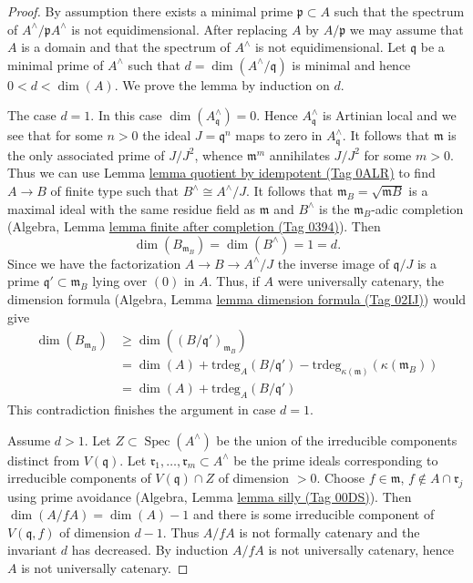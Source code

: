 \documentclass{amsart}
\theoremstyle{plain}
\theoremstyle{definition}
\theoremstyle{remark}
\numberwithin{equation}{subsection}
\def\Spec{\mathop{\mathrm{Spec}}}
\begin{document}
\begin{proof}
By assumption there exists a minimal prime $\mathfrak p \subset A$ such that
the spectrum of $A^\wedge /\mathfrak p A^\wedge$ is not equidimensional.
After replacing $A$ by $A/\mathfrak p$ we may assume that $A$
is a domain and that the spectrum of $A^\wedge$ is not equidimensional.
Let $\mathfrak q$ be a minimal prime of
$A^\wedge$ such that $d = \dim(A^\wedge/\mathfrak q)$
is minimal and hence $0 < d < \dim(A)$. We prove the lemma by induction
on $d$.

\medskip\noindent
The case $d = 1$. In this case $\dim(A^\wedge_\mathfrak q) = 0$.
Hence $A^\wedge_\mathfrak q$ is Artinian local and we see that
for some $n > 0$ the ideal $J = \mathfrak q^n$ maps to zero in
$A^\wedge_\mathfrak q$. It follows that $\mathfrak m$ is the
only associated prime of $J/J^2$, whence $\mathfrak m^m$ annihilates
$J/J^2$ for some $m > 0$. Thus we can use
Lemma \href{https://stacks.math.columbia.edu/tag/0ALR}{lemma quotient by idempotent (Tag 0ALR)}
to find $A \to B$ of finite type such that $B^\wedge \cong A^\wedge/J$.
It follows that $\mathfrak m_B = \sqrt{\mathfrak mB}$ is a maximal
ideal with the same residue field as $\mathfrak m$ and $B^\wedge$
is the $\mathfrak m_B$-adic completion
(Algebra, Lemma \href{https://stacks.math.columbia.edu/tag/0394}{lemma finite after completion (Tag 0394)}).
Then
$$
\dim(B_{\mathfrak m_B}) = \dim(B^\wedge) = 1 = d.
$$
Since we have the factorization $A \to B \to A^\wedge/J$ the inverse image
of $\mathfrak q/J$ is a prime $\mathfrak q' \subset \mathfrak m_B$ lying
over $(0)$ in $A$. Thus, if $A$ were universally catenary, the dimension
formula (Algebra, Lemma \href{https://stacks.math.columbia.edu/tag/02IJ}{lemma dimension formula (Tag 02IJ)}) would give
\begin{align*}
\dim(B_{\mathfrak m_B})
& \geq
\dim((B/\mathfrak q')_{\mathfrak m_B}) \\
& =
\dim(A) + \text{trdeg}_A(B/\mathfrak q') -
\text{trdeg}_{\kappa(\mathfrak m)}(\kappa(\mathfrak m_B)) \\
& =
\dim(A) + \text{trdeg}_A(B/\mathfrak q')
\end{align*}
This contradiction finishes the argument in case $d = 1$.

\medskip\noindent
Assume $d > 1$. Let $Z \subset \Spec(A^\wedge)$ be the union of
the irreducible components distinct from $V(\mathfrak q)$.
Let $\mathfrak r_1, \ldots, \mathfrak r_m \subset A^\wedge$
be the prime ideals corresponding to irreducible components of
$V(\mathfrak q) \cap Z$ of dimension $> 0$.
Choose $f \in \mathfrak m$, $f \not \in A \cap \mathfrak r_j$
using prime avoidance (Algebra, Lemma \href{https://stacks.math.columbia.edu/tag/00DS}{lemma silly (Tag 00DS)}).
Then $\dim(A/fA) = \dim(A) - 1$ and there is some irreducible
component of $V(\mathfrak q, f)$ of dimension $d - 1$.
Thus $A/fA$ is not formally catenary and the invariant $d$ has
decreased. By induction $A/fA$ is not universally catenary, hence
$A$ is not universally catenary.
\end{proof}
\end{document}
